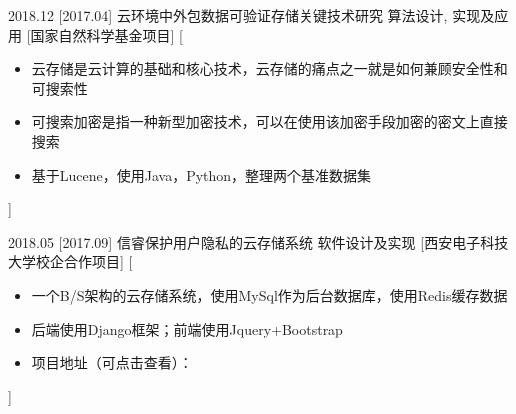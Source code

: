\documentclass[zh]{resume}
\begin{document}
\begin{experiences}
  \experience
    {2018.12}%
    [2017.04]%
    {云环境中外包数据可验证存储关键技术研究}%
    {算法设计, 实现及应用}%
    [国家自然科学基金项目]%
    [\begin{itemize}
      \item{\icon{\faFlag}} 云存储是云计算的基础和核心技术，云存储的痛点之一就是如何兼顾安全性和可搜索性
      \item{\icon{\faFlag}} 可搜索加密是指一种新型加密技术，可以在使用该加密手段加密的密文上直接搜索
      \item{\icon{\faCheck}} 基于Lucene，使用Java，Python，整理两个基准数据集  %
    \end{itemize}]%

  \separator{0.1em}
%


  \separator{0.1em}
  \experience
    {2018.05}%
    [2017.09]%
    {信睿保护用户隐私的云存储系统}%
    {软件设计及实现}%
    [西安电子科技大学校企合作项目]%
    [\begin{itemize}
      \item{\icon{\faFlag}} 一个B/S架构的云存储系统，使用MySql作为后台数据库，使用Redis缓存数据
      \item{\icon{\faFlag}} 后端使用Django框架；前端使用Jquery+Bootstrap
      \item{\icon{\faCheck}} 项目地址（可点击查看）： 
    \end{itemize}]%




\end{experiences}
\end{document}
